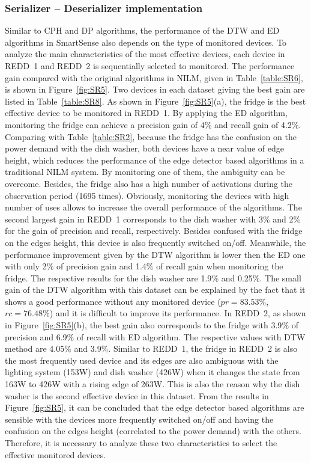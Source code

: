 \subsubsection{Serializer -- Deserializer implementation}

Similar to CPH and DP algorithms, the performance of the DTW and ED algorithms in SmartSense also depends on the type of monitored devices. To analyze the main characteristics of the most effective devices, each device in REDD~1 and REDD~2 is sequentially selected to monitored. The performance gain compared with the original algorithms in NILM, given in Table~\ref{table:SR6}, is shown in Figure~\ref{fig:SR5}. Two devices in each dataset giving the best gain are listed in Table~\ref{table:SR8}.
As shown in Figure~\ref{fig:SR5}(a), the fridge is the best effective device to be monitored in REDD~1. By applying the ED algorithm, monitoring the fridge can achieve a precision gain of 4$\%$ and recall gain of 4.2$\%$. Comparing with Table~\ref{table:SR2}, because the fridge has the confusion on the power demand with the dish washer, both devices have a near value of edge height, which reduces the performance of the edge detector based algorithms in a traditional NILM system. By monitoring one of them, the ambiguity can be overcome. Besides, the fridge also has a high number of activations during the observation period (1695 times). Obviously, monitoring the devices with high number of uses allows to increase the overall performance of the algorithms. The second largest gain in REDD~1 corresponds to the dish washer with 3$\%$ and 2$\%$ for the gain of precision and recall, respectively. Besides confused with the fridge on the edges height, this device is also frequently switched on/off. 
Meanwhile, the performance improvement given by the DTW algorithm is lower then the ED one with only 2$\%$ of precision gain and 1.4$\%$ of recall gain when monitoring the fridge. The respective results for the dish washer are 1.9$\%$ and 0.25$\%$. The small gain of the DTW algorithm with this dataset can be explained by the fact that it shows a good performance without any monitored device ($pr=83.53\%$, $rc=76.48\%$) and it is difficult to improve its performance.
In REDD~2, as shown in Figure~\ref{fig:SR5}(b), the best gain also corresponds to the fridge with 3.9$\%$ of precision and 6.9$\%$ of recall with ED algorithm. The respective values with DTW method are 4.05$\%$ and 3.9$\%$. Similar to REDD~1, the fridge in REDD~2 is also the most frequently used device and its edges are also ambiguous with the lighting system (153W) and dish washer (426W) when it changes the state from 163W to 426W with a rising edge of 263W. This is also the reason why the dish washer is the second effective device in this dataset.
From the results in Figure~\ref{fig:SR5}, it can be concluded that the edge detector based algorithms are sensible with the devices more frequently switched on/off and having the confusion on the edges height (correlated to the power demand) with the others. Therefore, it is necessary to analyze these two characteristics to select the effective monitored devices.

